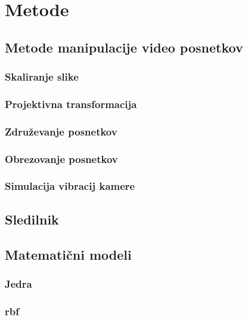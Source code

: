 \chapter{Metode}\label{sec:metode}




\section{Metode manipulacije video posnetkov}

\subsection{Skaliranje slike}
\subsection{Projektivna transformacija}
\subsection{Združevanje posnetkov}
\subsection{Obrezovanje posnetkov}
\subsection{Simulacija vibracij kamere}


\section{Sledilnik}
% 

\section{Matematični modeli}
\subsection{Jedra}
\subsection{rbf}
